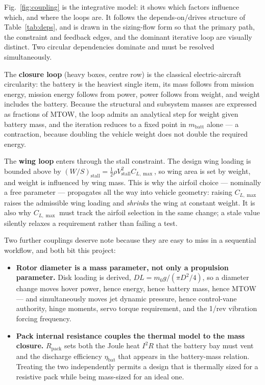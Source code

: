 Fig.~\ref{fig:coupling} is the integrative model: it shows which
factors influence which, and where the loops are. It follows the
depends-on/drives structure of Table~\ref{tab:deps}, and is drawn in the
sizing-flow form so that the primary path, the constraint and feedback
edges, and the dominant iterative loop are visually distinct. Two
circular dependencies dominate and must be resolved simultaneously.

The \textbf{closure loop} (heavy boxes, centre row) is the classical
electric-aircraft circularity: the battery is the heaviest single item,
its mass follows from mission energy, mission energy follows from
power, power follows from weight, and weight includes the battery.
Because the structural and subsystem masses are expressed as fractions
of MTOW, the loop admits an analytical step for weight given battery
mass, and the iteration reduces to a fixed point in
$m_{\mathrm{batt}}$ alone --- a contraction, because doubling the
vehicle weight does not double the required energy.

The \textbf{wing loop} enters through the stall constraint. The design
wing loading is bounded above by
$(W/S)_{\mathrm{stall}}=\tfrac{1}{2}\rho V_{\mathrm{stall}}^{2}
C_{L,\max}$, so wing area is set by weight, and weight is influenced by
wing mass. This is why the airfoil choice --- nominally a free
parameter --- propagates all the way into vehicle geometry: raising
$C_{L,\max}$ raises the admissible wing loading and \emph{shrinks} the
wing at constant weight. It is also why $C_{L,\max}$ must track the
airfoil selection in the same change; a stale value silently relaxes a
requirement rather than failing a test.

Two further couplings deserve note because they are easy to miss in a
sequential workflow, and both bit this project:

\begin{itemize}[nosep]
\item \textbf{Rotor diameter is a mass parameter, not only a
  propulsion parameter.} Disk loading is derived, $DL=m_0g/(\pi
  D^{2}/4)$, so a diameter change moves hover power, hence energy,
  hence battery mass, hence MTOW --- and simultaneously moves jet
  dynamic pressure, hence control-vane authority, hinge moments, servo
  torque requirement, and the 1/rev vibration forcing frequency.
\item \textbf{Pack internal resistance couples the thermal model to
  the mass closure.} $R_{\mathrm{pack}}$ sets both the Joule heat
  $I^{2}R$ that the battery bay must vent and the discharge efficiency
  $\eta_{\mathrm{bat}}$ that appears in the battery-mass relation.
  Treating the two independently permits a design that is thermally
  sized for a resistive pack while being mass-sized for an ideal one.
\end{itemize}

